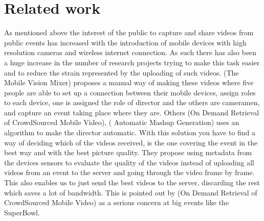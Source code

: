 \documentclass[conference]{IEEEtran}
\begin{document}
\section{Related work}
As mentioned above the interest of the public to capture and share videos from public events has increased with the introduction of mobile devices with high resolution cameras and wireless internet connection. As such there has also been a huge increase in the number of research projects trying to make this task easier and to reduce the strain represented by the uploading of such videos. (The Mobile Vision Mixer) proposes a manual way of making these videos where five people are able to set up a connection between their mobile devices, assign roles to each device, one is assigned the role of director and the others are cameramen, and capture an event taking place where they are.
Others (On Demand Retrieval of CrowdSourced Mobile Video), ( Automatic Mashup Generation) uses an algorithm to make the director automatic. With this solution you have to find a way of deciding which of the videos received, is the one covering the event in the best way and with the best picture quality. They propose using metadata from the devices sensors to evaluate the quality of the videos instead of uploading all videos from an event to the server and going through the video frame by frame. This also enables us to just send the best videos to the server, discarding the rest which saves a lot of bandwidth. This is pointed out by (On Demand Retrieval of CrowdSourced Mobile Video) as a serious concern at big events like the SuperBowl.
\end{document}

